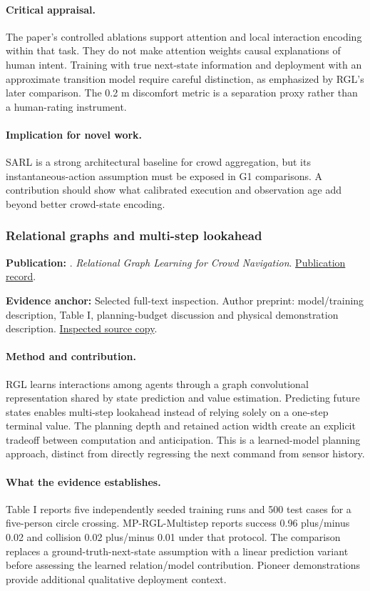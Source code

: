\paragraph{Critical appraisal.} The paper's controlled ablations support attention and local interaction encoding within that task. They do not make attention weights causal explanations of human intent. Training with true next-state information and deployment with an approximate transition model require careful distinction, as emphasized by RGL's later comparison. The 0.2 m discomfort metric is a separation proxy rather than a human-rating instrument.

\paragraph{Implication for novel work.} SARL is a strong architectural baseline for crowd aggregation, but its instantaneous-action assumption must be exposed in G1 comparisons. A contribution should show what calibrated execution and observation age add beyond better crowd-state encoding.

\subsubsection{Relational graphs and multi-step lookahead}\label{paper:rgl}
\textbf{Publication:} \citet{rgl}. \emph{Relational Graph Learning for Crowd Navigation}. \href{https://doi.org/10.1109/iros45743.2020.9340705}{Publication record}.

\textbf{Evidence anchor:} Selected full-text inspection. Author preprint: model/training description, Table I, planning-budget discussion and physical demonstration description. \href{https://arxiv.org/pdf/1909.13165}{Inspected source copy}.

\paragraph{Method and contribution.} RGL learns interactions among agents through a graph convolutional representation shared by state prediction and value estimation. Predicting future states enables multi-step lookahead instead of relying solely on a one-step terminal value. The planning depth and retained action width create an explicit tradeoff between computation and anticipation. This is a learned-model planning approach, distinct from directly regressing the next command from sensor history.

\paragraph{What the evidence establishes.} Table I reports five independently seeded training runs and 500 test cases for a five-person circle crossing. MP-RGL-Multistep reports success 0.96 plus/minus 0.02 and collision 0.02 plus/minus 0.01 under that protocol. The comparison replaces a ground-truth-next-state assumption with a linear prediction variant before assessing the learned relation/model contribution. Pioneer demonstrations provide additional qualitative deployment context.

